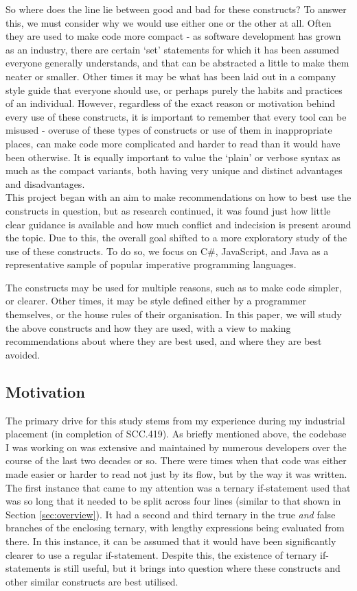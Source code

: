\documentclass{article}
\begin{document}
        So where does the line lie between good and bad for these constructs? To answer this, we must consider why we would use either one or the other at all. Often they are used to make code more compact - as software development has grown as an industry, there are certain `set' statements for which it has been assumed everyone generally understands, and that can be abstracted a little to make them neater or smaller. Other times it may be what has been laid out in a company style guide that everyone should use, or perhaps purely the habits and practices of an individual. However, regardless of the exact reason or motivation behind every use of these constructs, it is important to remember that every tool can be misused - overuse of these types of constructs or use of them in inappropriate places, can make code more complicated and harder to read than it would have been otherwise. It is equally important to value the `plain' or verbose syntax as much as the compact variants, both having very unique and distinct advantages and disadvantages.
        \\

        This project began with an aim to make recommendations on how to best use the constructs in question, but as research continued, it was found just how little clear guidance is available and how much conflict and indecision is present around the topic. Due to this, the overall goal shifted to a more exploratory study of the use of these constructs. To do so, we focus on C\#, JavaScript, and Java as a representative sample of popular imperative programming languages.

        The constructs may be used for multiple reasons, such as to make code simpler, or clearer. Other times, it may be style defined either by a programmer themselves, or the house rules of their organisation.  In this paper, we will study the above constructs and how they are used, with a view to making recommendations about where they are best used, and where they are best avoided.

    \subsection{Motivation}
        The primary drive for this study stems from my experience during my industrial placement (in completion of SCC.419). As briefly mentioned above, the codebase I was working on was extensive and maintained by numerous developers over the course of the last two decades or so. There were times when that code was either made easier or harder to read not just by its flow, but by the way it was written. The first instance that came to my attention was a ternary if-statement used that was so long that it needed to be split across four lines (similar to that shown in Section \ref{sec:overview}). It had a second and third ternary in the true \emph{and} false branches of the enclosing ternary, with lengthy expressions being evaluated from there. In this instance, it can be assumed that it would have been significantly clearer to use a regular if-statement. Despite this, the existence of ternary if-statements is still useful, but it brings into question where these constructs and other similar constructs are best utilised.
\end{document}
